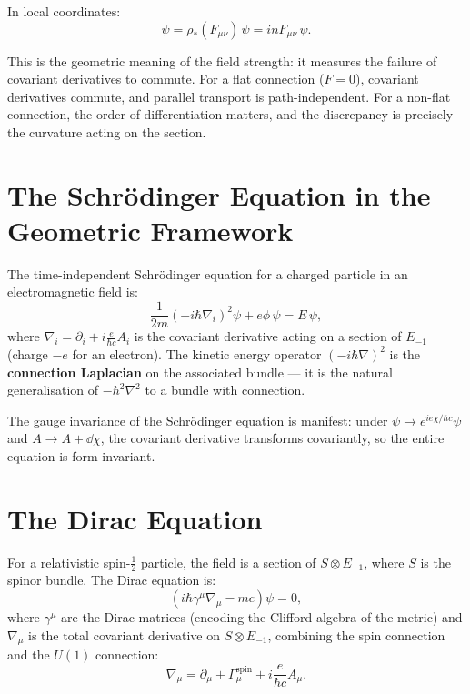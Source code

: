 In local coordinates:
\begin{equation}
[\nabla_\mu, \nabla_\nu]\psi = \rho_*(F_{\mu\nu})\,\psi = inF_{\mu\nu}\,\psi.
\end{equation}

This is the geometric meaning of the field strength: it measures the failure of covariant derivatives to commute. For a flat connection ($F = 0$), covariant derivatives commute, and parallel transport is path-independent. For a non-flat connection, the order of differentiation matters, and the discrepancy is precisely the curvature acting on the section.

\section{The Schr\"odinger Equation in the Geometric Framework}

The time-independent Schr\"odinger equation for a charged particle in an electromagnetic field is:
\begin{equation}
\frac{1}{2m}\left(-i\hbar\nabla_i\right)^2\psi + e\phi\,\psi = E\,\psi,
\end{equation}
where $\nabla_i = \partial_i + i\frac{e}{\hbar c}A_i$ is the covariant derivative acting on a section of $E_{-1}$ (charge $-e$ for an electron). The kinetic energy operator $(-i\hbar\nabla)^2$ is the \textbf{connection Laplacian} on the associated bundle --- it is the natural generalisation of $-\hbar^2\nabla^2$ to a bundle with connection.

The gauge invariance of the Schr\"odinger equation is manifest: under $\psi \to e^{ie\chi/\hbar c}\psi$ and $A \to A + \dd\chi$, the covariant derivative transforms covariantly, so the entire equation is form-invariant.

\section{The Dirac Equation}

For a relativistic spin-$\frac{1}{2}$ particle, the field is a section of $S \otimes E_{-1}$, where $S$ is the spinor bundle. The Dirac equation is:
\begin{equation}
(i\hbar\gamma^\mu\nabla_\mu - mc)\psi = 0,
\end{equation}
where $\gamma^\mu$ are the Dirac matrices (encoding the Clifford algebra of the metric) and $\nabla_\mu$ is the total covariant derivative on $S \otimes E_{-1}$, combining the spin connection and the $U(1)$ connection:
\begin{equation}
\nabla_\mu = \partial_\mu + \Gamma_\mu^{\text{spin}} + i\frac{e}{\hbar c}A_\mu.
\end{equation}

